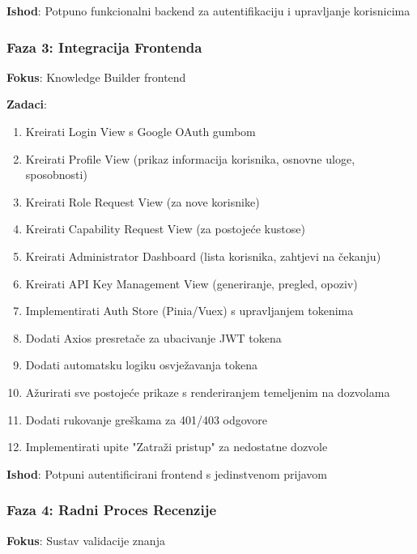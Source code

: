\documentclass[12pt,a4paper]{article}
\begin{document}
\textbf{Ishod}: Potpuno funkcionalni backend za autentifikaciju i upravljanje korisnicima

\subsubsection{Faza 3: Integracija Frontenda}
\textbf{Fokus}: Knowledge Builder frontend

\textbf{Zadaci}:
\begin{enumerate}
    \item Kreirati Login View s Google OAuth gumbom
    \item Kreirati Profile View (prikaz informacija korisnika, osnovne uloge, sposobnosti)
    \item Kreirati Role Request View (za nove korisnike)
    \item Kreirati Capability Request View (za postojeće kustose)
    \item Kreirati Administrator Dashboard (lista korisnika, zahtjevi na čekanju)
    \item Kreirati API Key Management View (generiranje, pregled, opoziv)
    \item Implementirati Auth Store (Pinia/Vuex) s upravljanjem tokenima
    \item Dodati Axios presretače za ubacivanje JWT tokena
    \item Dodati automatsku logiku osvježavanja tokena
    \item Ažurirati sve postojeće prikaze s renderiranjem temeljenim na dozvolama
    \item Dodati rukovanje greškama za 401/403 odgovore
    \item Implementirati upite "Zatraži pristup" za nedostatne dozvole
\end{enumerate}

\textbf{Ishod}: Potpuni autentificirani frontend s jedinstvenom prijavom

\subsubsection{Faza 4: Radni Proces Recenzije}
\textbf{Fokus}: Sustav validacije znanja
\end{document}

